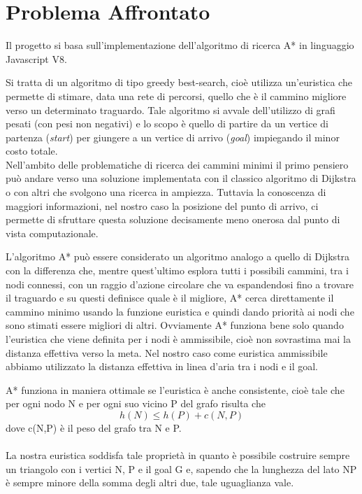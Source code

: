 \documentclass[12pt,a4paper]{report}
\begin{document}
\tableofcontents
\chapter{Problema Affrontato}
Il progetto si basa sull'implementazione dell'algoritmo di ricerca A* in linguaggio Javascript V8.

Si tratta di un algoritmo di tipo greedy best-search, cioè utilizza un'euristica che permette di stimare, data una rete di percorsi, quello che è il cammino migliore verso un determinato traguardo.
Tale algoritmo si avvale dell'utilizzo di grafi pesati (con pesi non negativi) e lo scopo è quello di partire da un vertice di partenza (\emph{start}) per giungere a un vertice di arrivo (\emph{goal}) impiegando il minor costo totale. 
\\

Nell'ambito delle problematiche di ricerca dei cammini minimi il primo pensiero può andare verso una soluzione implementata con il classico algoritmo di Dijkstra o con altri che svolgono una ricerca in ampiezza. Tuttavia la conoscenza di maggiori informazioni, nel nostro caso la posizione del punto di arrivo, ci permette di sfruttare questa soluzione decisamente meno onerosa dal punto di vista computazionale.

L'algoritmo A* può essere considerato un algoritmo analogo a quello di Dijkstra con la differenza che, mentre quest'ultimo esplora tutti i possibili cammini, tra i nodi connessi, con un raggio d'azione circolare che va espandendosi fino a trovare il traguardo e su questi definisce quale è il migliore, A* cerca direttamente il cammino minimo usando la funzione euristica e quindi dando priorità ai nodi che sono stimati essere migliori di altri. Ovviamente A* funziona bene solo quando l'euristica che viene definita per i nodi è ammissibile, cioè non sovrastima mai la distanza effettiva verso la meta. Nel nostro caso come euristica ammissibile abbiamo utilizzato la distanza effettiva in linea d'aria tra i nodi e il goal.

A* funziona in maniera ottimale se l'euristica è anche consistente, cioè tale che per ogni nodo N e per ogni suo vicino P del grafo risulta che \[h(N) \leq h(P) + c(N,P)\]dove c(N,P) è il peso del grafo tra N e P.\\\\La nostra euristica soddisfa tale proprietà in quanto è possibile costruire sempre un triangolo con i vertici N, P e il goal G e, sapendo che la lunghezza del lato NP è sempre minore della somma degli altri due, tale uguaglianza vale.
\end{document}
